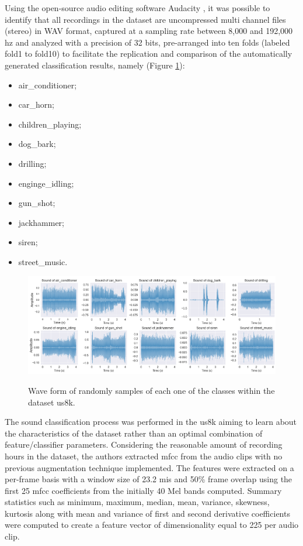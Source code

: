Using the open-source audio editing software Audacity \cite{Audacity2024}, it was possible to identify that all recordings in the dataset are uncompressed multi channel files (stereo) in WAV format, captured at a sampling rate between 8,000 and 192,000 \gls{hz} and analyzed with a precision of 32 bits, pre-arranged into ten folds (labeled fold1 to fold10) to facilitate the replication and comparison of the automatically generated classification results, namely (Figure \ref{fig:methods_dataset_US8K}):
\begin{itemize}
    \item air\_conditioner;
    \item car\_horn;
    \item children\_playing; 
    \item dog\_bark; 
    \item drilling; 
    \item enginge\_idling; 
    \item gun\_shot; 
    \item jackhammer; 
    \item siren; 
    \item street\_music.
\end{itemize}

\vspace{12pt}

\begin{figure}[htbp]
    \raggedright
        \caption{Wave form of randomly samples of each one of the classes within the dataset \gls{us8k}.}
        \includegraphics[width=1\textwidth]{resources/images/050-methods/Methods_dataset_US8K.png}
        \label{fig:methods_dataset_US8K}
\end{figure}

The sound classification process was performed in the \gls{us8k} aiming to learn about the characteristics of the dataset rather than an optimal combination of feature/classifier parameters. Considering the reasonable amount of recording hours in the dataset, the authors extracted \gls{mfcc} from the audio clips with no previous augmentation technique implemented. The features were extracted on a per-frame basis with a window size of 23.2 \gls{mi}\gls{s} and 50\% frame overlap using the first 25 \gls{mfcc} coefficients from the initially 40 Mel bands computed. Summary statistics such as minimum, maximum, median, mean, variance, skewness, kurtosis along with mean and variance of first and second derivative coefficients were computed to create a feature vector of dimensionality equal to 225 per audio clip.


